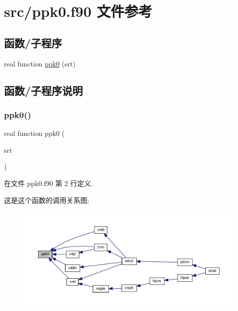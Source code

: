 \hypertarget{ppk0_8f90}{}\section{src/ppk0.f90 文件参考}
\label{ppk0_8f90}
\subsection*{函数/子程序}
\begin{DoxyCompactItemize}
\item 
real function \mbox{\hyperlink{ppk0_8f90_aeedee056302a13fbc5ffb257e31398c5}{ppk0}} (srt)
\end{DoxyCompactItemize}


\subsection{函数/子程序说明}
\mbox{\label{ppk0_8f90_aeedee056302a13fbc5ffb257e31398c5}} 
\subsubsection{\texorpdfstring{ppk0()}{ppk0()}}
{\footnotesize\ttfamily real function ppk0 (\begin{DoxyParamCaption}\item[{}]{srt }\end{DoxyParamCaption})}



在文件 ppk0.\+f90 第 2 行定义.

这是这个函数的调用关系图\+:
\nopagebreak
\begin{figure}[H]
\begin{center}
\leavevmode
\includegraphics[width=350pt]{ppk0_8f90_aeedee056302a13fbc5ffb257e31398c5_icgraph}
\end{center}
\end{figure}
